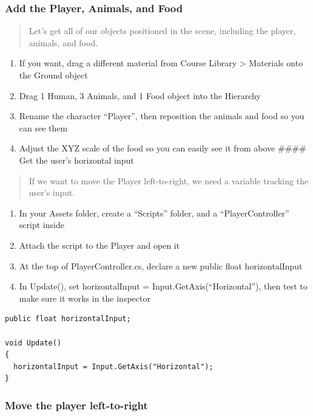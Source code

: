 \documentclass[
]{book}
\providecommand{\tightlist}{%
  \setlength{\itemsep}{0pt}\setlength{\parskip}{0pt}}
\begin{document}
\hypertarget{add-the-player-animals-and-food}{%
\subsubsection{Add the Player, Animals, and Food}\label{add-the-player-animals-and-food}}

\begin{quote}
Let's get all of our objects positioned in the scene, including the player, animals, and food.
\end{quote}

\begin{enumerate}
\def\labelenumi{\arabic{enumi}.}
\tightlist
\item
  If you want, drag a different material from Course Library \textgreater{} Materials onto the Ground object
\item
  Drag 1 Human, 3 Animals, and 1 Food object into the Hierarchy
\item
  Rename the character ``Player'', then reposition the animals and food so you can see them
\item
  Adjust the XYZ scale of the food so you can easily see it from above
  \#\#\#\# Get the user's horizontal input
\end{enumerate}

\begin{quote}
If we want to move the Player left-to-right, we need a variable tracking the user's input.
\end{quote}

\begin{enumerate}
\def\labelenumi{\arabic{enumi}.}
\tightlist
\item
  In your Assets folder, create a ``Scripts'' folder, and a ``PlayerController'' script inside
\item
  Attach the script to the Player and open it
\item
  At the top of PlayerController.cs, declare a new public float horizontalInput
\item
  In Update(), set horizontalInput = Input.GetAxis(``Horizontal''), then test to make sure it works in the inspector
\end{enumerate}

\begin{verbatim}
public float horizontalInput;

void Update()
{
  horizontalInput = Input.GetAxis("Horizontal");
}
\end{verbatim}

\hypertarget{move-the-player-left-to-right}{%
\subsubsection{Move the player left-to-right}\label{move-the-player-left-to-right}}
\end{document}
